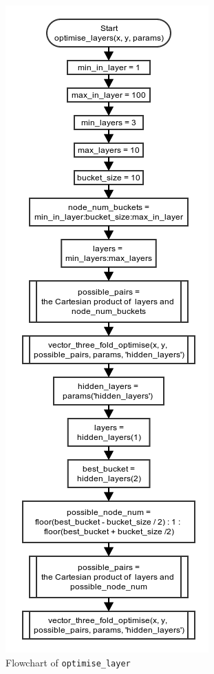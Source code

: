 \documentclass[10pt,a4paper]{article}
\begin{document}
\begin{figure}[!ht]
	\centering
	\includegraphics[scale=0.7]{images/flow_chart/optimise_layer.png}
	\caption{Flowchart of \tt{optimise\_layer}}
	\label{fig:optimise_layer}
\end{figure}
\end{document}
